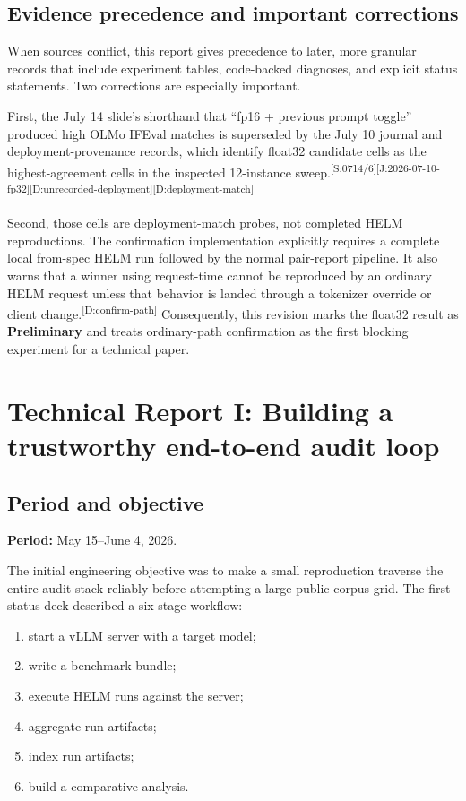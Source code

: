 \documentclass[11pt,oneside]{report}
\newcommand{\code}[1]{\texttt{\detokenize{#1}}}
\newcommand{\statusPreliminary}{\textcolor{preliminary}{\textbf{Preliminary}}\xspace}
\newcommand{\evmark}[1]{\allowbreak\textsuperscript{\scriptsize\textnormal{[#1]}}}
\newcommand{\slideref}[2]{\evmark{S:#1/#2}}
\newcommand{\docref}[1]{\evmark{D:#1}}
\newcommand{\journalref}[1]{\evmark{J:#1}}
\begin{document}
\section{Evidence precedence and important corrections}

When sources conflict, this report gives precedence to later, more granular records that include experiment tables, code-backed diagnoses, and explicit status statements. Two corrections are especially important.

First, the July 14 slide's shorthand that ``fp16 + previous prompt toggle'' produced high OLMo IFEval matches is superseded by the July 10 journal and deployment-provenance records, which identify float32 candidate cells as the highest-agreement cells in the inspected 12-instance sweep.\slideref{0714}{6}\journalref{2026-07-10-fp32}\docref{unrecorded-deployment}\docref{deployment-match}

Second, those cells are deployment-match probes, not completed HELM reproductions. The confirmation implementation explicitly requires a complete local from-spec HELM run followed by the normal pair-report pipeline. It also warns that a winner using request-time \code{add_special_tokens=False} cannot be reproduced by an ordinary HELM request unless that behavior is landed through a tokenizer override or client change.\docref{confirm-path} Consequently, this revision marks the float32 result as \statusPreliminary and treats ordinary-path confirmation as the first blocking experiment for a technical paper.

\chapter{Technical Report I: Building a trustworthy end-to-end audit loop}
\label{ch:e2e}

\section{Period and objective}

\textbf{Period:} May 15--June 4, 2026.

The initial engineering objective was to make a small reproduction traverse the entire audit stack reliably before attempting a large public-corpus grid. The first status deck described a six-stage workflow:

\begin{enumerate}
  \item start a vLLM server with a target model;
  \item write a benchmark bundle;
  \item execute HELM runs against the server;
  \item aggregate run artifacts;
  \item index run artifacts;
  \item build a comparative analysis.
\end{enumerate}
\end{document}
